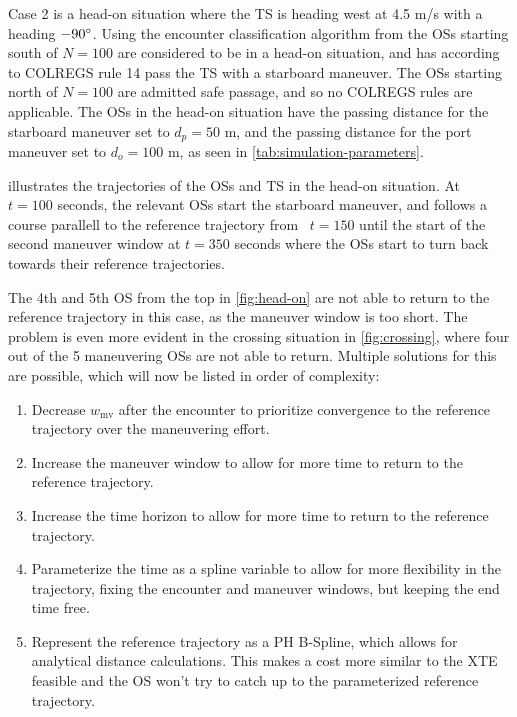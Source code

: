 Case 2 is a head-on situation where the TS is heading west at 4.5 m/s with a heading $-90\degree$. Using the encounter classification algorithm from \cite{Thyri2022-Confined-Waters} the OSs starting south of $N=100$ are considered to be in a head-on situation, and has according to COLREGS rule 14 pass the TS with a starboard maneuver. The OSs starting north of $N=100$ are admitted safe passage, and so no COLREGS rules are applicable. The OSs in the head-on situation have the passing distance for the starboard maneuver set to $d_p=50$ m, and the passing distance for the port maneuver set to $d_o=100$ m, as seen in \cref{tab:simulation-parameters}.  

 illustrates the trajectories of the OSs and TS in the head-on situation. At ~$t=100$ seconds, the relevant OSs start the starboard maneuver, and follows a course parallell to the reference trajectory from ~$t=150$ until the start of the second maneuver window at $t=350$ seconds where the OSs start to turn back towards their reference trajectories. 

The 4th and 5th OS from the top in \cref{fig:head-on} are not able to return to the reference trajectory in this case, as the maneuver window is too short. The problem is even more evident in the crossing situation in \cref{fig:crossing}, where four out of the 5 maneuvering OSs are not able to return. Multiple solutions for this are possible, which will now be listed in order of complexity:
\begin{enumerate}
    \item Decrease $w_\text{mv}$ after the encounter to prioritize convergence to the reference trajectory over the maneuvering effort.
    \item Increase the maneuver window to allow for more time to return to the reference trajectory.
    \item Increase the time horizon to allow for more time to return to the reference trajectory.
    \item Parameterize the time as a spline variable to allow for more flexibility in the trajectory, fixing the encounter and maneuver windows, but keeping the end time free.
    \item Represent the reference trajectory as a PH B-Spline, which allows for analytical distance calculations. This makes a cost more similar to the XTE feasible and the OS won't try to catch up to the parameterized reference trajectory.
\end{enumerate}

